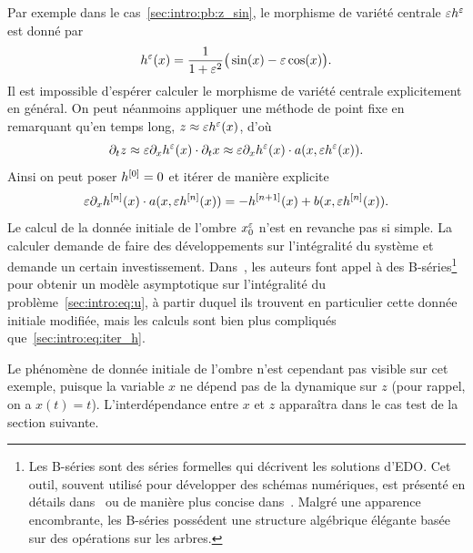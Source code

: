 Par exemple dans le cas~\eqref{sec:intro:pb:z_sin}, le morphisme de variété centrale $\varepsilon h^{\varepsilon}$ est donné par 
\begin{equation} \label{sec:intro:eq:h_sin}
    h^{\varepsilon}(x) 
    = \frac{1}{1 + \varepsilon^2} \big( \sin(x) - \varepsilon \cos(x) \big) .
\end{equation}
Il est impossible d'espérer calculer le morphisme de variété centrale explicitement en général. On peut néanmoins appliquer une méthode de point fixe en remarquant qu'en temps long, $z \approx \varepsilon h^{\varepsilon}(x)$, d'où 
\begin{equation*}
    \partial_t z \approx \varepsilon \partial_x h^{\varepsilon}(x) \cdot \partial_t x
    \approx \varepsilon \partial_x h^{\varepsilon}(x) \cdot a(x, \varepsilon h^{\varepsilon}(x)) . 
\end{equation*} Ainsi on peut poser $h^{[0]} = 0$ et itérer de manière explicite
\begin{equation} \label{sec:intro:eq:iter_h}
    \varepsilon \partial_x h^{[n]}(x) \cdot a(x, \varepsilon h^{[n]} (x)) 
    = - h^{[n+1]}(x) + b(x, \varepsilon h^{[n]} (x)) .
\end{equation}
Le calcul de la donnée initiale de l'ombre $x^{\varepsilon}_0$ n'est en revanche pas si simple. La calculer demande de faire des développements sur l'intégralité du système et demande un certain investissement. Dans~\cite{castella.2016.formal}, les auteurs font appel à des B-séries\footnote{
    Les B-séries sont des séries formelles qui décrivent les solutions d'EDO. Cet outil, souvent utilisé pour développer des schémas numériques, est présenté en détails dans~\cite[Chap.~III]{hairer.2006.geometric} ou de manière plus concise dans~\cite{chartier.2010.algebraic}. Malgré une apparence encombrante, les B-séries possédent une structure algébrique élégante basée sur des opérations sur les arbres.
} pour obtenir un modèle asymptotique sur l'intégralité du problème~\eqref{sec:intro:eq:u}, à partir duquel ils trouvent en particulier cette donnée initiale modifiée, mais les calculs sont bien plus compliqués que~\eqref{sec:intro:eq:iter_h}.

\begin{FRremark*}
    Le phénomène de donnée initiale de l'ombre n'est cependant pas visible sur cet exemple, puisque la variable $x$ ne dépend pas de la dynamique sur $z$ (pour rappel, on a $x(t) = t$). L'interdépendance entre $x$ et $z$ apparaîtra dans le cas test de la section suivante.
\end{FRremark*}

